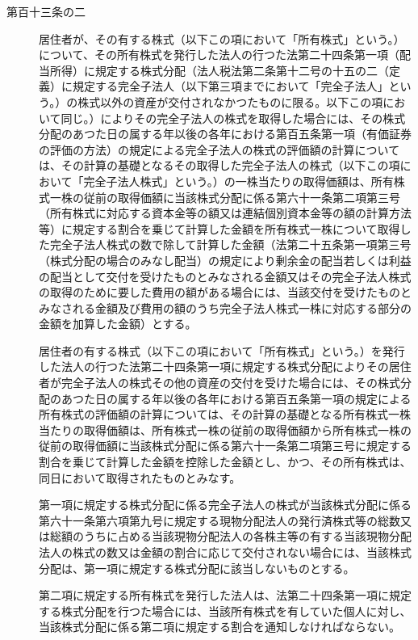 \documentclass[twocolumn,a4j,10pt]{ltjtarticle}
\begin{document}
\begin{description}
\item[第百十三条の二]居住者が、その有する株式（以下この項において「所有株式」という。）について、その所有株式を発行した法人の行つた法第二十四条第一項（配当所得）に規定する株式分配（法人税法第二条第十二号の十五の二（定義）に規定する完全子法人（以下第三項までにおいて「完全子法人」という。）の株式以外の資産が交付されなかつたものに限る。以下この項において同じ。）によりその完全子法人の株式を取得した場合には、その株式分配のあつた日の属する年以後の各年における第百五条第一項（有価証券の評価の方法）の規定による完全子法人の株式の評価額の計算については、その計算の基礎となるその取得した完全子法人の株式（以下この項において「完全子法人株式」という。）の一株当たりの取得価額は、所有株式一株の従前の取得価額に当該株式分配に係る第六十一条第二項第三号（所有株式に対応する資本金等の額又は連結個別資本金等の額の計算方法等）に規定する割合を乗じて計算した金額を所有株式一株について取得した完全子法人株式の数で除して計算した金額（法第二十五条第一項第三号（株式分配の場合のみなし配当）の規定により剰余金の配当若しくは利益の配当として交付を受けたものとみなされる金額又はその完全子法人株式の取得のために要した費用の額がある場合には、当該交付を受けたものとみなされる金額及び費用の額のうち完全子法人株式一株に対応する部分の金額を加算した金額）とする。
\item[]居住者の有する株式（以下この項において「所有株式」という。）を発行した法人の行つた法第二十四条第一項に規定する株式分配によりその居住者が完全子法人の株式その他の資産の交付を受けた場合には、その株式分配のあつた日の属する年以後の各年における第百五条第一項の規定による所有株式の評価額の計算については、その計算の基礎となる所有株式一株当たりの取得価額は、所有株式一株の従前の取得価額から所有株式一株の従前の取得価額に当該株式分配に係る第六十一条第二項第三号に規定する割合を乗じて計算した金額を控除した金額とし、かつ、その所有株式は、同日において取得されたものとみなす。
\item[]第一項に規定する株式分配に係る完全子法人の株式が当該株式分配に係る第六十一条第六項第九号に規定する現物分配法人の発行済株式等の総数又は総額のうちに占める当該現物分配法人の各株主等の有する当該現物分配法人の株式の数又は金額の割合に応じて交付されない場合には、当該株式分配は、第一項に規定する株式分配に該当しないものとする。
\item[]第二項に規定する所有株式を発行した法人は、法第二十四条第一項に規定する株式分配を行つた場合には、当該所有株式を有していた個人に対し、当該株式分配に係る第二項に規定する割合を通知しなければならない。
\end{description}
\end{document}
